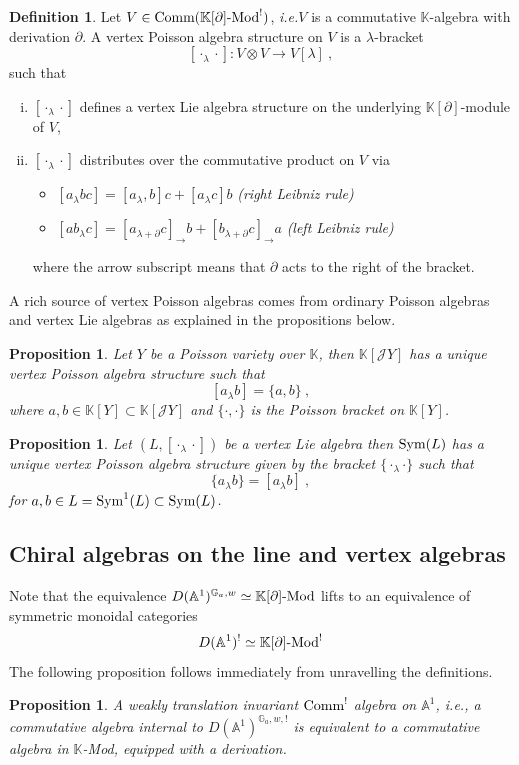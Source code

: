 \documentclass[11pt]{amsart}
\numberwithin{equation}{section}
\newtheorem{prop}[theo]{Proposition}
\theoremstyle{definition}
\newtheorem{defn}[theo]{Definition}
\newcommand{\bb}{\mathbb}
\newcommand{\mc}{\mathcal}
\newcommand{\Mod}{{\textup{-Mod}}}
\newcommand{\ik}{{\bb K}}
\newcommand{\Comm}{{\textup{Comm}}}
\newcommand{\0}{{\textbf{0}}}
\newcommand{\DD}{{D}}
\newcommand{\Sym}{\textup{Sym}}
\newcommand{\del}{{{\partial}}}
\def\IA{\mathbb{A}}
\def\IG{\mathbb{G}}
\def\JJ{{\mc J}}
\def \ie{{\it i.e.}}
\begin{document}
\begin{defn}
	Let $V\in\Comm(\ik[\partial]\Mod^!)$, \ie $V$ is a commutative $\ik$-algebra with derivation $\del$. A vertex Poisson algebra structure on $V$ is a $\lambda$-bracket 
	\[
	[\cdot_\lambda\cdot]:V\otimes V\rightarrow V[\lambda]~,
	\]
	such that 
	\begin{enumerate}[(i)]
		\item $[\cdot_\lambda\cdot]$ defines a vertex Lie algebra structure on the underlying $\ik[\partial]$-module of $V$,
		\item $[\cdot_\lambda \cdot]$ distributes over the commutative product on $V$ via
		\begin{itemize}
			\item $[{a}_\lambda b c] = [{a}_\lambda,b]c + [{a}_\lambda c]b$ \emph{(right Leibniz rule)}
			\item $[a{b}_\lambda c]= [{a}_{\lambda+\partial} c]_{\rightarrow}b + [{b}_{\lambda+\partial} c]_{\rightarrow} a$ \emph{(left Leibniz rule)}
		\end{itemize}
		where the arrow subscript means that $\del$ acts to the right of the bracket.
		\end{enumerate}
\end{defn}

A rich source of vertex Poisson algebras comes from ordinary Poisson algebras and vertex Lie algebras as explained in the propositions below.

\begin{prop}
	Let $Y$ be a Poisson variety over $\ik$, then $\ik[\JJ Y]$ has a unique vertex Poisson algebra structure such that 
	\[
	[a_\lambda b] = \{a,b\}~,
	\]
	where $a,b\in \ik[Y]\subset \ik[\JJ Y]$ and $\{\cdot,\cdot\}$ is the Poisson bracket on $\ik[Y]$.
\end{prop}


\begin{prop}
	Let $(L,[\cdot_\lambda\cdot])$ be a vertex Lie algebra then $\Sym(L)$ has a unique vertex Poisson algebra structure given by the bracket $\{\cdot_\lambda\cdot\}$ such that
	\[
	\{a_\lambda b\} = [a_\lambda b]~,
	\]
	for $a,b\in L= \Sym^1(L)\subset \Sym(L)$.
\end{prop}

\subsection{Chiral algebras on the line and vertex algebras}\label{ssec:weakly trans inv chiral alg}
Note that the equivalence $\DD(\IA^1)^{\IG_a,w} \simeq \ik[\partial]\textup{-Mod}$ lifts to an equivalence of symmetric monoidal categories
\[
\DD(\IA^1)^!\simeq \ik[\partial]\textup{-Mod}^!
\]
The following proposition follows immediately from unravelling the definitions.
\begin{prop}
A weakly translation invariant $\Comm^!$ algebra on $\IA^1$, \ie, a commutative algebra internal to $\DD(\IA^1)^{\IG_a,w,!}$ is equivalent to a commutative algebra in $\ik$-Mod, equipped with a derivation.
\end{prop}
\end{document}
